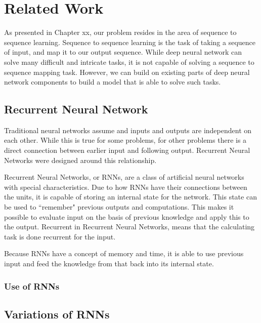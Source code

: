 
\chapter{Related Work}
\label{ch:related_work}
As presented in Chapter xx, our problem resides in the area of sequence to sequence learning. Sequence to sequence learning is the task of taking a sequence of input, and map it to our output sequence. While deep neural network can solve many difficult and intricate tasks, it is not capable of solving a sequence to sequence mapping task. However, we can build on existing parts of deep neural network components to build a model that is able to solve such tasks.


\section{Recurrent Neural Network}
Traditional neural networks assume and inputs and outputs are independent on each other. While this is true for some problems, for other problems there is a direct connection between earlier input and following output. Recurrent Neural Networks were designed around this relationship.

Recurrent Neural Networks, or RNNs, are a class of artificial neural networks with special characteristics. Due to how RNNs have their connections between the units, it is capable of storing an internal state for the network. This state can be used to ``remember" previous outputs and computations. This makes it possible to evaluate input on the basis of previous knowledge and apply this to the output. Recurrent in Recurrent Neural Networks, means that the calculating task is done recurrent for the input.


Because RNNs have a concept of memory and time, it is able to use previous input and feed the knowledge from that back into its internal state. 

\subsection{Use of RNNs}


\section{Variations of RNNs}

